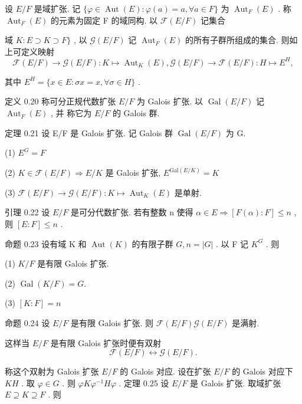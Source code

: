 \documentclass[]{article}
\begin{document}
设 $E / F$ 是域扩张. 记 $\{ \varphi \in \operatorname { A u t } ( E ) : \varphi ( a ) = a , \forall a \in F \}$ 为 $\operatorname { A u t } _ { F } ( E )$ . 称 $\operatorname { A u t } _ { F } ( E )$ 的元素为固定 F 的域同构. 以 $\mathcal { F } ( E / F )$ 记集合 {域 $K : E \supset K \supset F \}$ , 以 $\mathcal { G } ( E / F )$ 记 $\operatorname { A u t } _ { F } ( E )$ 的所有子群所组成的集合. 则如上可定义映射$$
	\mathcal {F} (E / F) \to \mathcal {G} (E / F): K \mapsto \operatorname{Aut} _ {K} (E), \mathcal {G} (E / F) \to \mathcal {F} (E / F): H \mapsto E ^ {H},
	$$
	
其中 $E ^ { H } = \{ x \in E : \sigma x = x , \forall \sigma \in H \}$ . 
 
	
	
定义 0.20 称可分正规代数扩张 $E / F$ 为 Galois 扩张. 以 $\operatorname { G a l } ( E / F )$ 记 $\operatorname { A u t } _ { F } ( E )$ , 并 称它为 $E / F$ 的 Galois 群. 

定理 0.21 设 E/F 是 Galois 扩张. 记 Galois 群 $\operatorname { G a l } ( E / F )$ 为 G. 

(1) $E ^ { G } = F$ 
 
(2) $K \in \mathcal { F } ( E / F ) \Rightarrow E / K$ 是 Galois 扩张, $E ^ { \mathrm { G a l } ( E / K ) } = K$ 

(3) ${ \mathcal { F } } ( E / F ) \to { \mathcal { G } } ( E / F ) : K \mapsto \operatorname { A u t } _ { K } ( E )$ 是单射. 

引理 0.22 设 $E / F$ 是可分代数扩张. 若有整数 n 使得 $\alpha \in E \Rightarrow [ F ( \alpha ) : F ] \leqslant n$ , 则 $[ E : F ] \leqslant n$ . 

命题 0.23 设有域 K 和 $\operatorname { A u t } ( K )$ 的有限子群 $G , n = | G |$ . 以 F 记 $K ^ { G }$ . 则 

(1) $K / F$ 是有限 Galois 扩张. 

(2) $\operatorname { G a l } ( K / F ) = G .$ 

(3) $[ K : F ] = n$ 

命题 0.24 设 $E / F$ 是有限 Galois 扩张. 则 $\mathcal { F } ( E / F )  \mathcal { G } ( E / F )$ 是满射. 

这样当 $E / F$ 是有限 Galois 扩张时便有双射 $$
\mathscr {F} (E / F) \leftrightarrow \mathscr {G} (E / F).
$$

称这个双射为 Galois 扩张 $E / F$ 的 Galois 对应. 设在扩张 $E / F$ 的 Galois 对应下 $K  H$ . 取 $\varphi \in G$ . 则 $\varphi K  \varphi ^ { - 1 } H \varphi$ . 
定理 0.25 设 $E / F$ 是 Galois 扩张. 取域扩张 $E \supseteq K \supseteq F$ . 则 

}
\end{document}
